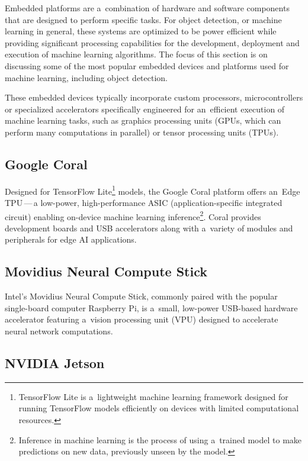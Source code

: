 Embedded platforms are a~combination of hardware and software components that
are designed to perform specific tasks. For object detection, or machine
learning in general, these systems are optimized to be power efficient while
providing significant processing capabilities for the development, deployment
and execution of machine learning algorithms. The focus of this section is on
discussing some of the most popular embedded devices and platforms used for
machine learning, including object detection.

These embedded devices typically incorporate custom processors, microcontrollers
or specialized accelerators specifically engineered for an~efficient execution of
machine learning tasks, such as graphics processing units (GPUs, which can
perform many computations in parallel) or tensor processing units (TPUs).


\subsection{Google Coral}

Designed for TensorFlow Lite\footnote{TensorFlow Lite is a~lightweight machine
learning framework designed for running TensorFlow models efficiently on devices
with limited computational resources.} models, the Google Coral platform offers
an~Edge TPU\,---\,a low-power, high-performance ASIC (application-specific
integrated circuit) enabling on-device machine learning
inference\footnote{Inference in machine learning is the process of using
a~trained model to make predictions on new data, previously unseen by the model.}.
Coral provides development boards and USB accelerators along with a~variety of
modules and peripherals for edge AI applications.


\subsection{Movidius Neural Compute Stick}

Intel's Movidius Neural Compute Stick, commonly paired with the popular
single-board computer Raspberry Pi, is a~small, low-power USB-based hardware
accelerator featuring a~vision processing unit (VPU) designed to accelerate
neural network computations.


\subsection{NVIDIA Jetson}
\label{Jetsons}

